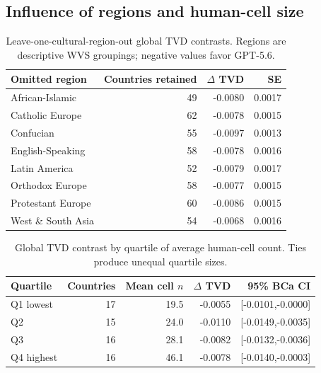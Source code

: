 \subsection{Influence of regions and human-cell size}
\begin{table}[!htbp]\centering\small
\caption{Leave-one-cultural-region-out global TVD contrasts. Regions are descriptive WVS groupings; negative values favor GPT-5.6.}\label{tab:leave-region}
\begin{tabular}{lrrr}\toprule
\rowcolor{tablehead} Omitted region & Countries retained & $\Delta$ TVD & SE \\\midrule
African-Islamic & 49 & -0.0080 & 0.0017 \\
Catholic Europe & 62 & -0.0078 & 0.0015 \\
Confucian & 55 & -0.0097 & 0.0013 \\
English-Speaking & 58 & -0.0078 & 0.0016 \\
Latin America & 52 & -0.0079 & 0.0017 \\
Orthodox Europe & 58 & -0.0077 & 0.0015 \\
Protestant Europe & 60 & -0.0086 & 0.0015 \\
West \& South Asia & 54 & -0.0068 & 0.0016 \\
\bottomrule\end{tabular}\end{table}
\begin{table}[!htbp]\centering\small
\caption{Global TVD contrast by quartile of average human-cell count. Ties produce unequal quartile sizes.}\label{tab:cell-quartiles}
\begin{tabular}{lrrrr}\toprule
\rowcolor{tablehead} Quartile & Countries & Mean cell $n$ & $\Delta$ TVD & 95\% BCa CI \\\midrule
Q1 lowest & 17 & 19.5 & -0.0055 & [-0.0101,-0.0000] \\
Q2 & 15 & 24.0 & -0.0110 & [-0.0149,-0.0035] \\
Q3 & 16 & 28.1 & -0.0082 & [-0.0132,-0.0036] \\
Q4 highest & 16 & 46.1 & -0.0078 & [-0.0140,-0.0003] \\
\bottomrule\end{tabular}\end{table}\FloatBarrier
